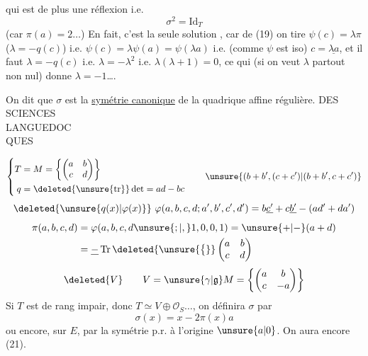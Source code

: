 qui est de plus une réflexion i.e.
\[
\sigma^2=\mathrm{Id}_T\tag*{(21)}
\]
(car  $\pi(a)=2\ldots$) En fait, c'est la seule solution ,  car de (19) on tire $\psi(c)=\lambda\pi$ ($\lambda=-q(c)$)  i.e. $\psi(c)=\lambda\psi(a)=\psi(\lambda a)$ i.e. (comme $\psi$ est iso) $c=\underline{\lambda a}$, et il faut $\lambda=-q(c)$ i.e. $\lambda=-\lambda^2$ i.e. $\lambda(\lambda+1)=0$, ce qui (si on veut $\lambda$ partout non nul) donne $\lambda=-1$\ldots.

On dit que $\sigma$ est la \uline{symétrie canonique} de la quadrique affine régulière.
DES SCIENCES\\
 LANGUEDOC\\
QUES


\[
\left\{\begin{aligned}
T&=M=\left\{\begin{pmatrix}a&b\\c&d\end{pmatrix}\right\}\\
q&=\deleted{\unsure{\mathrm{tr}}}\det=ad-bc
\end{aligned}\right.
\qquad\unsure{(b+b',(c+c')|(b+b',c+c')}
\]
\[
\deleted{\unsure{q(x)|\varphi(x)}}\ \varphi(a,b,c,d;a',b',c',d')
=b\underline{c'}+c\underline{b'}-(ad'+da')
\]
\[
\begin{aligned}
\pi(a,b,c,d)&=\varphi(a,b,c,d\unsure{;|,}1,0,0,1)=\unsure{+|-}(a+d)\\
&=\underline{-}\operatorname{Tr}\deleted{\unsure{\bigl\{}}\begin{pmatrix}a&b\\c&d\end{pmatrix}
\end{aligned}
\]
\[
\deleted{V}\qquad V=\unsure{\gamma|\mathfrak g}M=\left\{\begin{pmatrix}a&b\\c&-a\end{pmatrix}\right\}
\]
Si $T$ est de rang impair, donc $T\simeq V\oplus\mathcal O_S\ldots$, on définira  $\sigma$ par
\[
\sigma(x)=x-2\pi(x)a\tag*{(22)}
\]
ou encore, sur $E$, par la symétrie p.r. à l'origine $\unsure{a|0}$. On aura encore (21).

